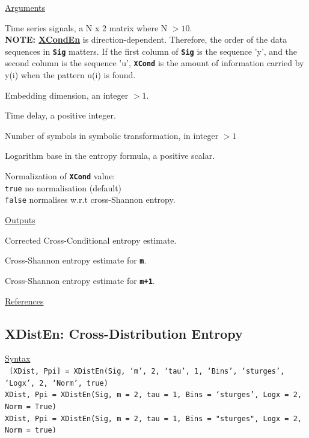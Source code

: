 \documentclass[12pt, a4paper, titlepage, openany]{book}
\begin{document}
\noindent \ul{Arguments}
\begin{description}[labelsep=1cm, labelwidth=2cm, nosep, style=multiline,leftmargin=3cm]\footnotesize
\item[\texttt{Sig}]		Time series signals, a N x 2 matrix where N $> 10$.\\
\textbf{NOTE: \ul{XCondEn}} is direction-dependent. Therefore, the order of the
    data sequences in \texttt{\textbf{Sig}} matters. If the first column of \texttt{\textbf{Sig}} is the
    sequence 'y', and the second column is the sequence 'u', \texttt{\textbf{XCond}} is
    the amount of information carried by y(i) when the pattern u(i) is found.
\item[\texttt{m}]		Embedding dimension, an integer $> 1$.
\item[\texttt{tau}]		Time delay, a positive integer.
\item[\texttt{c}]		Number of symbols in symbolic transformation, in integer $> 1$
\item[\texttt{Logx}]	Logarithm base in the entropy formula, a positive scalar.
\item[\texttt{Norm}]	Normalization of \texttt{\textbf{XCond}} value:\\
		  \texttt{true} \hspace{15pt}  no normalisation (default)\\
		  \texttt{false} \hspace{10pt}  normalises w.r.t cross-Shannon entropy.
\end{description}

\noindent \ul{Outputs}
\begin{description}[labelsep=1cm, labelwidth=2cm, nosep, style=multiline,leftmargin=3cm]\footnotesize
\item[\texttt{XCond}]		Corrected Cross-Conditional entropy estimate.
\item[\texttt{SEw}]		Cross-Shannon entropy estimate for \texttt{\textbf{m}}.
\item[\texttt{SEz}]		Cross-Shannon entropy estimate for \texttt{\textbf{m+1}}.
\end{description}

\noindent \ul{References}\hspace{1cm}
\cite{Cond1}



\newpage
\subsection{\normalsize XDistEn: \hspace{15mm} Cross-Distribution Entropy}
\noindent\ul{Syntax} \vspace{6mm} \\ \noindent \texttt{\footnotesize
[XDist, Ppi] = XDistEn(Sig, ‘m’, 2, ‘tau’, 1, ‘Bins’, ‘sturges’, ‘Logx’, 2, ‘Norm’, true)\\
XDist, Ppi  = XDistEn(Sig, m = 2, tau = 1, Bins = ‘sturges’, Logx = 2, Norm = True)\\ 
XDist, Ppi  = XDistEn(Sig, m = 2, tau = 1, Bins = "sturges", Logx = 2, Norm = true)}
\end{document}
